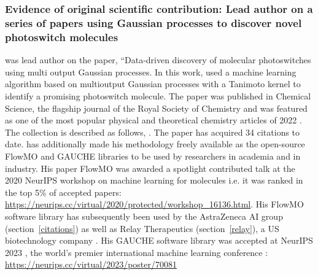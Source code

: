 \documentclass[11pt]{article}
\begin{document}
 \\\\ \dg


\subsubsection{Evidence of original scientific contribution: Lead author on a series of papers using Gaussian processes to discover novel photoswitch molecules}
\label{photoswitch}

\dr was lead author on the paper, “Data-driven discovery of molecular photoswitches using multi output Gaussian processes. In this work, \dr used a machine learning algorithm based on multioutput Gaussian processes with a Tanimoto kernel to identify a promising photoswitch molecule. The paper was published in Chemical Science, the flagship journal of the Royal Society of Chemistry and was featured as one of the most popular physical and theoretical chemistry articles of 2022 \cite{most_pop}. The collection is described as follows,  \cite{most_pop}. The paper has acquired 34 citations to date. \dr has additionally made his methodology freely available as the open-source FlowMO and GAUCHE libraries to be used by researchers in academia and in industry. His paper FlowMO was awarded a spotlight contributed talk at the 2020 NeurIPS workshop on machine learning for molecules i.e. it was ranked in the top 5\% of accepted papers: \url{https://neurips.cc/virtual/2020/protected/workshop_16136.html}. His FlowMO software library has subsequently been used by the AstraZeneca AI group (section~\ref{citations}) as well as Relay Therapeutics (section~\ref{relay}), a US biotechnology company \cite{media}. His GAUCHE software library was accepted at NeurIPS 2023 \cite{neurips_papers}, the world's premier international machine learning conference \cite{gscholar}: \url{https://neurips.cc/virtual/2023/poster/70081} \\
\end{document}
